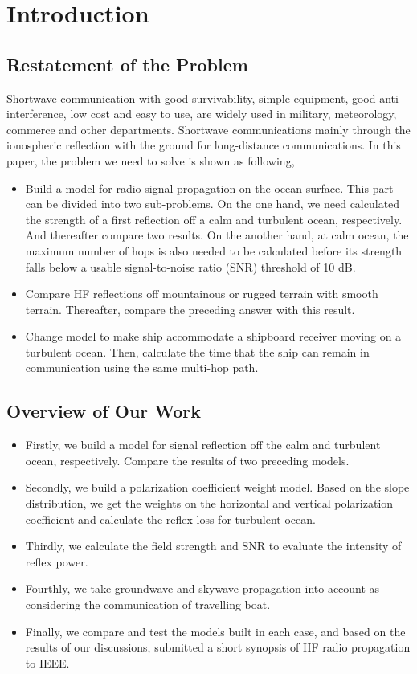 \documentclass{mcmthesis}
\begin{document}
\section{Introduction}
\subsection{Restatement of the Problem}
Shortwave communication with good survivability, simple equipment, good anti-interference, low cost and easy to use, are widely used in military, meteorology, commerce and other departments. Shortwave communications mainly through the ionospheric reflection with the ground for long-distance communications. In this paper, the problem we need to solve is shown as following,
\begin{itemize}
\item Build a model for radio signal propagation on the ocean surface. This part can be divided into two sub-problems. On the one hand, we need calculated 
the strength of a first reflection off a calm and turbulent ocean, respectively. And thereafter compare two results. On the another hand, at calm ocean, the maximum number of hops is also needed to be calculated before its strength falls below a usable signal-to-noise ratio (SNR) threshold of 10 dB. 
\item Compare HF reflections off mountainous or rugged terrain with smooth terrain. Thereafter, compare the preceding answer with this result.
\item Change model to make ship accommodate a shipboard receiver moving on a turbulent ocean. Then, calculate the time that the ship can remain in communication using the same multi-hop path.
\end{itemize}

\subsection{Overview of Our Work}
\begin{itemize}
\item Firstly, we build a model for signal reflection off the calm and turbulent ocean, respectively. Compare the results of two preceding models.
\item Secondly, we build a polarization coefficient weight model. Based on the slope distribution, we get the weights on the horizontal and vertical polarization coefficient and calculate the reflex loss for turbulent ocean.
\item Thirdly, we calculate the field strength and SNR to evaluate the intensity of reflex power. 
\item Fourthly, we take groundwave and skywave propagation into account as considering the communication of travelling boat.
\item Finally, we compare and test the models built in each case, and based on the results of our discussions, submitted a short synopsis of HF radio propagation to IEEE.
\end{itemize}
\end{document}
